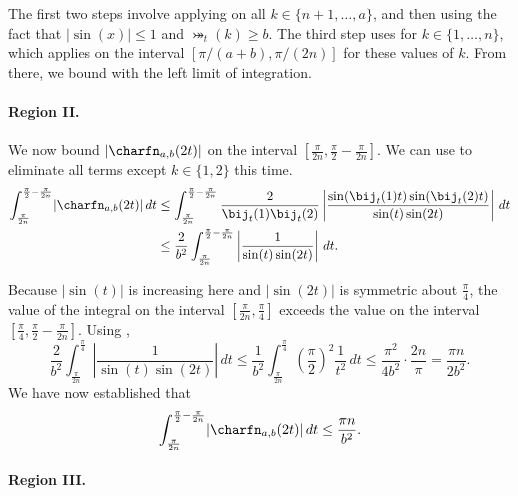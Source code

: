 The first two steps involve applying  on all $k \in \{n+1,\dots,a\}$, and then using the fact that $\lvert\sin(x)\rvert\le 1$ and $\bij_t(k)\ge b$. The third step uses  for $k \in \{1,\dots,n\}$, which applies on the interval $[\pi/(a+b),\pi/(2n)]$ for these values of $k$. From there, we bound with the left limit of integration.

\paragraph{Region II.}

We now bound $\lvert\charfn_{a,b}(2t)\rvert$ on the interval $[\frac{\pi}{2n},\frac{\pi}{2}-\frac{\pi}{2n}]$. We can use  to eliminate all terms except $k \in \{1,2\}$ this time.
\begin{align*}
    \int_{\frac{\pi}{2n}}^{\frac{\pi}{2}-\frac{\pi}{2n}} \lvert\charfn_{a,b}(2t)\rvert\,dt &\le \int_{\frac{\pi}{2n}}^{\frac{\pi}{2}-\frac{\pi}{2n}} \frac{2}{\bij_t(1)\bij_t(2)} \left\lvert\frac{\sin(\bij_t(1)t)\sin(\bij_t(2)t)}{\sin(t)\sin(2t)} \right\rvert\,dt\\
    &\le \frac{2}{b^2}\int_{\frac{\pi}{2n}}^{\frac{\pi}{2}-\frac{\pi}{2n}} \left\lvert\frac{1}{\sin(t)\sin(2t)} \right\rvert\,dt.
\end{align*}

Because $\lvert\sin(t)\rvert$ is increasing here and $\lvert\sin(2t)\rvert$ is symmetric about $\frac{\pi}{4}$, the value of the integral on the interval $[\frac{\pi}{2n},\frac{\pi}{4}]$ exceeds the value on the interval $[\frac{\pi}{4},\frac{\pi}{2}-\frac{\pi}{2n}]$. Using ,
\[\frac{2}{b^2}\int_{\frac{\pi}{2n}}^{\frac{\pi}{4}} \left\lvert\frac{1}{\sin(t)\sin(2t)} \right\rvert\,dt
\le \frac{1}{b^2}\int_{\frac{\pi}{2n}}^{\frac{\pi}{4}} \left(\frac{\pi}{2}\right)^2 \frac{1}{t^2}\,dt
\le  \frac{\pi^2}{4b^2}\cdot \frac{2n}{\pi}
=\frac{\pi n}{2b^2}.\]
We have now established that
\[\int_{\frac{\pi}{2n}}^{\frac{\pi}{2}-\frac{\pi}{2n}} \lvert\charfn_{a,b}(2t)\rvert\,dt \le \frac{\pi n}{b^2}.\]

\paragraph{Region III.}

